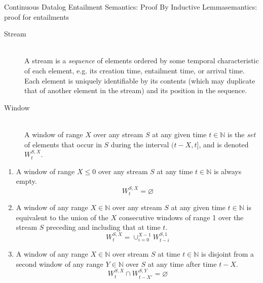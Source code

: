 \begin{nestedsection}{Continuous Datalog Entailment Semantics: Proof By Inductive Lemma}{semantics: proof for entailments}
	\begin{description}
		\item[Stream]\label{def:continuous datalog: stream}\hfill\\
			A stream is a \emph{sequence} of elements ordered by some temporal characteristic of each element, e.g. its creation time, entailment time, or arrival time.
			Each element is uniquely identifiable by its contents (which may duplicate that of another element in the stream) and its position in the sequence.
		\item[Window]\label{def:continuous datalog: window}\hfill\\
			A window of range $X$ over any stream $S$ at any given time ${t \in \mathbb{N}}$ is the \emph{set} of elements that occur in $S$ during the interval ${(t-X,t]}$, and is denoted ${W^{S,X}_{t}}$.
	\end{description}
	\begin{enumerate}
		\item\label{axiom:continuous datalog: window range leq 0}
			A window of range ${X \leq 0}$ over any stream $S$ at any time ${t \in \mathbb{N}}$ is always empty.
			\begin{equation*}
				W^{S,X}_{t} = \varnothing
			\end{equation*}
		\item\label{axiom:continuous datalog: window composition}
			A window of any range ${X \in \mathbb{N}}$ over any stream $S$ at any given time ${t \in \mathbb{N}}$ is equivalent to the union of the $X$ consecutive windows of range 1 over the stream $S$ preceding and including that at time $t$.
			\begin{equation*}
				W^{S,X}_t = \mathop{\cup}_{i=0}^{X-1} W^{S,1}_{t-i}
			\end{equation*}
		\item\label{axiom:continuous datalog: window disjointness}
			A window of any range ${X \in \mathbb{N}}$ over stream $S$ at time ${t \in \mathbb{N}}$ is disjoint from a second window of any range ${Y \in \mathbb{N}}$ over $S$ at any time after time ${t - X}$.
			\begin{equation*}
				W^{S,X}_t \cap W^{S,Y}_{t-X'} = \varnothing
			\end{equation*}
		\setcounter{continuousDatalogAxioms}{\theenumi}
	\end{enumerate}

\end{nestedsection}
